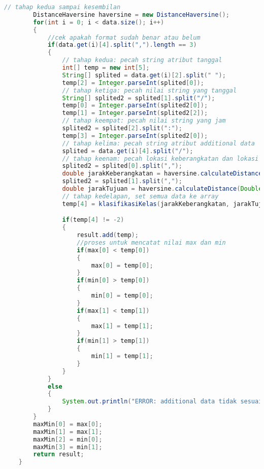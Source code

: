\begin{lstlisting}[language=Java,basicstyle=\tiny,caption=ProcessingData.java]
        // tahap kedua sampai kesembilan
        DistanceHaversine haversine = new DistanceHaversine();
        for(int i = 0; i < data.size(); i++)
        {
            //cek apakah format sudah benar atau belum
            if(data.get(i)[4].split(",").length == 3)
            {
                // tahap kedua: pecah string atribut tanggal
                int[] temp = new int[5];
                String[] splited = data.get(i)[2].split(" ");
                temp[2] = Integer.parseInt(splited[0]);
                // tahap ketiga: pecah nilai string yang tanggal
                String[] splited2 = splited[1].split("/");
                temp[0] = Integer.parseInt(splited2[0]);
                temp[1] = Integer.parseInt(splited2[2]);
                // tahap keempat: pecah nilai string yang jam
                splited2 = splited[2].split(":");
                temp[3] = Integer.parseInt(splited2[0]);
                // tahap kelima: pecah string atribut additional data
                splited = data.get(i)[4].split("/");
                // tahap keenam: pecah lokasi keberangkatan dan lokasi tujuan untuk mendapatkan lat n lon dan (ini tahap ketujuh) menghitung jarak terhadap titik pusat
                splited2 = splited[0].split(",");
                double jarakKeberangkatan = haversine.calculateDistance(Double.parseDouble(splited2[0]), Double.parseDouble(splited2[1]), -6.916667,107.6) * 1000;
                splited2 = splited[1].split(",");
                double jarakTujuan = haversine.calculateDistance(Double.parseDouble(splited2[0]), Double.parseDouble(splited2[1]), -6.916667,107.6) * 1000;
                // tahap kedelapan, set semua data ke array
                temp[4] = klasifikasiKelas(jarakKeberangkatan, jarakTujuan);

                if(temp[4] != -2)
                {
                    result.add(temp);
                    //proses untuk mencatat nilai max dan min
                    if(max[0] < temp[0])
                    {
                        max[0] = temp[0];
                    }
                    if(min[0] > temp[0])
                    {
                        min[0] = temp[0];
                    }
                    if(max[1] < temp[1])
                    {
                        max[1] = temp[1];
                    }
                    if(min[1] > temp[1])
                    {
                        min[1] = temp[1];
                    }
                }
            }
            else
            {
                System.out.println("ERROR: additional data tidak sesuai; " + data.get(i)[4]);
            }
        }
        maxMin[0] = max[0];
        maxMin[1] = max[1];
        maxMin[2] = min[0];
        maxMin[3] = min[1];
        return result;
    }
    

\end{lstlisting}
